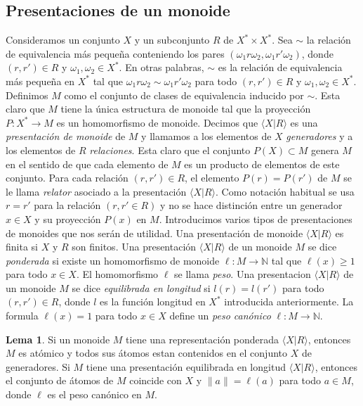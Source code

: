 \documentclass[12pt]{article}
\theoremstyle{definition}
\newtheorem{lema}{Lema}[section]
\providecommand{\norm}[1]{\lVert#1\rVert}
\begin{document}
\subsection{Presentaciones de un monoide}
Consideramos un conjunto $X$ y un subconjunto $R$ de $X^*\times X^*$. Sea $\sim$ la relación de equivalencia más pequeña conteniendo los pares $(\omega_1r\omega_2, \omega_1r'\omega_2)$, donde $(r,r')\in R$ y $\omega_1,\omega_2\in X^*$. En otras palabras, $\sim$ es la relación de equivalencia más pequeña en $X^*$ tal que $\omega_1r\omega_2\sim\omega_1r'\omega_2$ para todo $(r,r')\in R$ y $\omega_1,\omega_2\in X^*$. Definimos $M$ como el conjunto de clases de equivalencia inducido por $\sim$. Esta claro que $M$ tiene la única estructura de monoide tal que la proyección $P:X^*\rightarrow M$ es un homomorfismo de monoide. Decimos que $\langle X|R\rangle$ es una \textit{presentación de monoide} de $M$ y llamamos a los elementos de $X$ \textit{generadores} y a los elementos de $R$ \textit{relaciones}.
\newline
\newline
Esta claro que el conjunto $P(X)\subset M$ genera $M$ en el sentido de que cada elemento de $M$ es un producto de elementos de este conjunto. Para cada relación $(r,r')\in R$, el elemento $P(r)=P(r')$ de $M$ se le llama \textit{relator} asociado a la presentación $\langle X|R\rangle$. Como notación habitual se usa $r=r'$ para la relación $(r,r'\in R)$ y no se hace distinción entre un generador $x\in X$ y su proyección $P(x)$ en $M$.
\newline
\newline
Introducimos varios tipos de presentaciones de monoides que nos serán de utilidad. Una presentación de monoide $\langle X|R\rangle$ es finita si $X$ y $R$ son finitos. Una presentación $\langle X|R\rangle$ de un monoide $M$ se dice \textit{ponderada} si existe un homomorfismo de monoide $\ell:M\rightarrow \mathbb{N}$ tal que $\ell(x)\geq 1$ para todo $x\in X$. El homomorfismo $\ell$ se llama \textit{peso}.
\newline
\newline
Una presentacion $\langle X|R\rangle$ de un monoide $M$ se dice \textit{equilibrada en longitud} si $l(r)=l(r')$ para todo $(r,r')\in R$, donde $l$ es la función longitud en $X^*$ introducida anteriormente. La formula $\ell(x)=1$ para todo $x\in X$ define un \textit{peso canónico} $\ell:M\rightarrow \mathbb{N}$.

\begin{lema}
Si un monoide $M$ tiene una representación ponderada $\langle X|R\rangle$, entonces $M$ es atómico y todos sus átomos estan contenidos en el conjunto $X$ de generadores. Si $M$ tiene una presentación equilibrada en longitud $\langle X|R\rangle$, entonces el conjunto de átomos de $M$ coincide con $X$ y $\norm{a}=\ell(a)$ para todo $a\in M$, donde $\ell$ es el peso canónico en $M$.
\end{lema}
\end{document}
